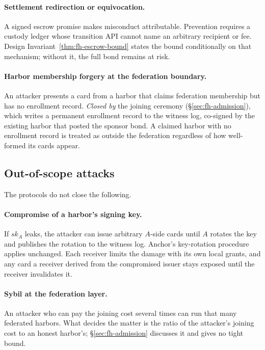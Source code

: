 \documentclass[11pt,a4paper]{article}
\theoremstyle{definition}
\theoremstyle{remark}
\begin{document}



\paragraph{Settlement redirection or equivocation.} A signed escrow promise makes misconduct attributable. Prevention requires a custody ledger whose transition API cannot name an arbitrary recipient or fee. Design Invariant~\ref{thm:fh-escrow-bound} states the bound conditionally on that mechanism; without it, the full bond remains at risk.

\paragraph{Harbor membership forgery at the federation boundary.} An attacker presents a card from a harbor that claims federation membership but has no enrollment record. \emph{Closed by} the joining ceremony (\S\ref{sec:fh-admission}), which writes a permanent enrollment record to the witness log, co-signed by the existing harbor that posted the sponsor bond. A claimed harbor with no enrollment record is treated as outside the federation regardless of how well-formed its cards appear.

\subsection{Out-of-scope attacks}\label{sec:fh-attacks-out}

The protocols do not close the following.

\paragraph{Compromise of a harbor's signing key.} If $\mathit{sk}_A$ leaks, the attacker can issue arbitrary $A$-side cards until $A$ rotates the key and publishes the rotation to the witness log. Anchor's key-rotation procedure applies unchanged. Each receiver limits the
damage with its own local grants, and any card a receiver derived from the
compromised issuer stays exposed until the receiver invalidates it.

\paragraph{Sybil at the federation layer.} An attacker who can pay the joining cost several times can run that many federated harbors. What decides the matter is the ratio of the attacker's joining cost to an honest harbor's; \S\ref{sec:fh-admission} discusses it and gives no tight bound.
\end{document}
